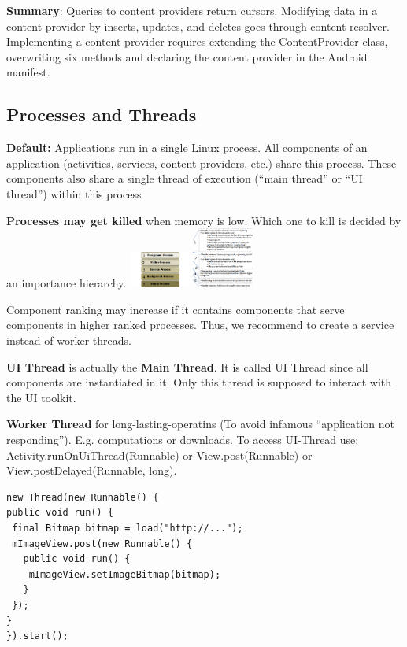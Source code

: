 \textbf{Summary}: Queries to content providers return cursors. Modifying data
in a content provider by inserts, updates, and deletes goes through content
resolver. Implementing a content provider requires extending the
ContentProvider class, overwriting six methods and declaring the content
provider in the Android manifest.

\subsection{Processes and Threads}
\textbf{Default:} Applications run in a single Linux process. All components of
an application (activities, services, content providers, etc.) share this
process. These components also share a single thread of execution (“main
thread” or “UI thread”) within this process

\textbf{Processes may get killed} when memory is low. Which one to kill is
decided by an importance hierarchy.
\includegraphics[width=0.15\textwidth]{android/importance_hierarchy_1.png}
\includegraphics[width=0.15\textwidth]{android/importance_hierarchy_2.png}

Component ranking may increase if it contains components that serve components
in higher ranked processes. Thus, we recommend to create a service instead of
worker threads.

\textbf{UI Thread} is actually the \textbf{Main Thread}. It is called UI Thread
since all components are instantiated in it. Only this thread is supposed to
interact with the UI toolkit.

\textbf{Worker Thread} for long-lasting-operatins (To avoid infamous
“application not responding”). E.g. computations or downloads. To access
UI-Thread use: Activity.runOnUiThread(Runnable) or View.post(Runnable) or
View.postDelayed(Runnable, long).

\begin{lstlisting}
new Thread(new Runnable() {
public void run() {
 final Bitmap bitmap = load("http://...");
 mImageView.post(new Runnable() {
   public void run() {
    mImageView.setImageBitmap(bitmap);
   }
 });
}
}).start();
\end{lstlisting}

